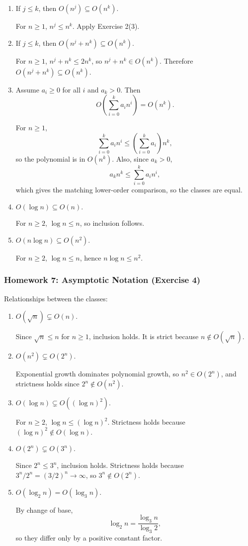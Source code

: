 \documentclass{article}
\theoremstyle{theorem}
\theoremstyle{definition}
\theoremstyle{remark}
\begin{document}
\begin{enumerate}
  \item If $j\le k$, then $O(n^j)\subseteq O(n^k)$.
  
  For $n\ge 1$, $n^j\le n^k$. Apply Exercise 2(3).

  \item If $j\le k$, then $O(n^j+n^k)\subseteq O(n^k)$.
  
  For $n\ge 1$, $n^j+n^k\le 2n^k$, so $n^j+n^k\in O(n^k)$. Therefore $O(n^j+n^k)\subseteq O(n^k)$.

  \item Assume $a_i\ge 0$ for all $i$ and $a_k>0$. Then
  \[
  O\!\left(\sum_{i=0}^{k} a_i n^i\right)=O(n^k).
  \]
  
  For $n\ge 1$,
  \[
  \sum_{i=0}^{k} a_i n^i \le \left(\sum_{i=0}^{k} a_i\right)n^k,
  \]
  so the polynomial is in $O(n^k)$.
  Also, since $a_k>0$,
  \[
  a_k n^k\le \sum_{i=0}^{k} a_i n^i,
  \]
  which gives the matching lower-order comparison, so the classes are equal.

  \item $O(\log n)\subseteq O(n)$.
  
  For $n\ge 2$, $\log n\le n$, so inclusion follows.

  \item $O(n\log n)\subseteq O(n^2)$.
  
  For $n\ge 2$, $\log n\le n$, hence $n\log n\le n^2$.
\end{enumerate}

\subsubsection{Homework 7: Asymptotic Notation (Exercise 4)}

Relationships between the classes:

\begin{enumerate}
  \item $O(\sqrt{n})\subsetneq O(n)$.
  
  Since $\sqrt{n}\le n$ for $n\ge 1$, inclusion holds. It is strict because $n\notin O(\sqrt{n})$.

  \item $O(n^2)\subsetneq O(2^n)$.
  
  Exponential growth dominates polynomial growth, so $n^2\in O(2^n)$, and strictness holds since $2^n\notin O(n^2)$.

  \item $O(\log n)\subsetneq O((\log n)^2)$.
  
  For $n\ge 2$, $\log n\le (\log n)^2$. Strictness holds because $(\log n)^2\notin O(\log n)$.

  \item $O(2^n)\subsetneq O(3^n)$.
  
  Since $2^n\le 3^n$, inclusion holds. Strictness holds because $3^n/2^n=(3/2)^n\to\infty$, so $3^n\notin O(2^n)$.

  \item $O(\log_2 n)=O(\log_3 n)$.
  
  By change of base,
  \[
  \log_2 n=\frac{\log_3 n}{\log_3 2},
  \]
  so they differ only by a positive constant factor.
\end{enumerate}
\end{document}
